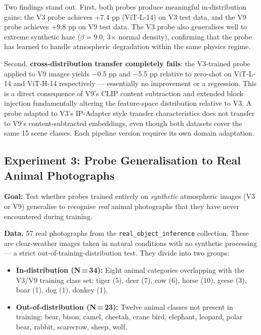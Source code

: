 \noindent Two findings stand out. First, both probes produce meaningful in-distribution gains: the V3 probe achieves +7.4 pp (ViT-L-14) on V3 test data, and the V9 probe achieves +9.8 pp on V9 test data. The V3 probe also generalises well to extreme synthetic haze ($\beta = 9.0$, 3$\times$ normal density), confirming that the probe has learned to handle atmospheric degradation within the same physics regime.

\noindent Second, \textbf{cross-distribution transfer completely fails}: the V3-trained probe applied to V9 images yields $-$0.5 pp and $-$5.5 pp relative to zero-shot on ViT-L-14 and ViT-H-14 respectively — essentially no improvement or a regression. This is a direct consequence of V9's CLIP content subtraction and extended block injection fundamentally altering the feature-space distribution relative to V3. A probe adapted to V3's IP-Adapter style transfer characteristics does not transfer to V9's content-subtracted embeddings, even though both datasets cover the same 15 scene classes. Each pipeline version requires its own domain adaptation.

\FloatBarrier
\subsection{Experiment 3: Probe Generalisation to Real Animal Photographs}
\label{sec:exp3}

\noindent \textbf{Goal:} Test whether probes trained entirely on \emph{synthetic} atmospheric images (V3 or V9) generalise to recognise \emph{real} animal photographs that they have never encountered during training.

\noindent \textbf{Data.} 57 real photographs from the \texttt{real\_object\_inference} collection. These are clear-weather images taken in natural conditions with no synthetic processing — a strict out-of-training-distribution test. They divide into two groups:
\begin{itemize}
    \item \textbf{In-distribution (N\,=\,34):} Eight animal categories overlapping with the V3/V9 training class set: tiger (5), deer (7), cow (6), horse (10), geese (3), boar (1), dog (1), donkey (1).
    \item \textbf{Out-of-distribution (N\,=\,23):} Twelve animal classes not present in training: bear, bison, camel, cheetah, crane bird, elephant, leopard, polar bear, rabbit, scarecrow, sheep, wolf.
\end{itemize}

